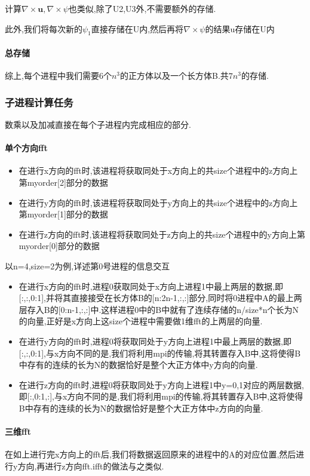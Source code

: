 \documentclass[UTF8]{ctexart}
\begin{document}
计算$\nabla \times \mathbf{u},\nabla \times \psi$也类似,除了U2,U3外,不需要额外的存储.

此外,我们将每次新的$\psi_1$直接存储在U内,然后再将$\nabla \times \psi$的结果u存储在U内

\paragraph{总存储}
综上,每个进程中我们需要6个$n^3$的正方体以及一个长方体B.共$7n^3$的存储.
\subsubsection{子进程计算任务}
数乘以及加减直接在每个子进程内完成相应的部分.
\paragraph{单个方向fft}
\begin{itemize}
\item 在进行x方向的fft时,该进程将获取同处于x方向上的共size个进程中的z方向上第myorder[2]部分的数据
\item 在进行y方向的fft时,该进程将获取同处于y方向上的共size个进程中的z方向上第myorder[1]部分的数据
\item 在进行z方向的fft时,该进程将获取同处于z方向上的共size个进程中的y方向上第myorder[0]部分的数据
\end{itemize}
以n=4,size=2为例,详述第0号进程的信息交互
\begin{itemize}
\item 在进行x方向的fft时,进程0获取同处于x方向上进程1中最上两层的数据,即[:,:,0:1],并将其直接接受在长方体B的[n:2n-1,:,:]部分,同时将0进程中A的最上两层存入B的[0:n-1,:,:]中.这样进程0中的B中就有了连续存储的n/size*n个长为N的向量,正好是x方向上这size个进程中需要做1维fft的上两层的向量.
\item 在进行y方向的fft时,进程0将获取同处于y方向上进程1中最上两层的数据,即[:,:,0:1],与x方向不同的是,我们将利用mpi的传输,将其转置存入B中,这将使得B中存有的连续的长为N的数据恰好是整个大正方体中y方向的向量.
\item  在进行z方向的fft时,进程0将获取同处于y方向上进程1中y=0,1对应的两层数据,即[:,0:1,:],与x方向不同的是,我们将利用mpi的传输,将其转置存入B中,这将使得B中存有的连续的长为N的数据恰好是整个大正方体中z方向的向量.
\end{itemize}
\paragraph{三维fft}
在如上进行完x方向上的fft后,我们将数据返回原来的进程中的A的对应位置,然后进行y方向,再进行z方向fft.ifft的做法与之类似.
\end{document}
